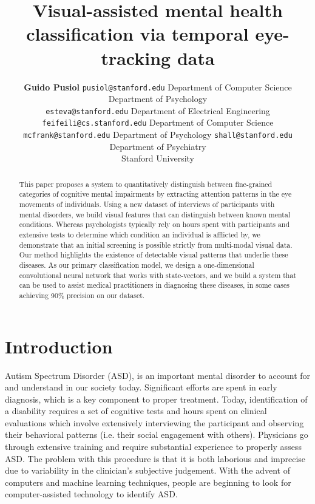 \documentclass[10pt,twocolumn,letterpaper]{article}
\begin{document}
\title{Visual-assisted mental health classification via temporal eye-tracking data}

\author{{\bf Guido Pusiol}
\texttt{pusiol@stanford.edu}
Department of Computer Science\\
Department of Psychology \\
\texttt{esteva@stanford.edu} 
Department of Electrical Engineering
\texttt{feifeili@cs.stanford.edu} 
Department of Computer Science
\texttt{mcfrank@stanford.edu}
Department of Psychology
\texttt{shall@stanford.edu}\\
  Department of Psychiatry\\
Stanford University}
  

\maketitle

\begin{abstract}
This paper proposes a system to quantitatively distinguish between fine-grained categories of cognitive mental impairments by extracting attention patterns in the eye movements of individuals.  
Using a new dataset of interviews of participants with mental disorders, we build visual features that can distinguish between known mental conditions. Whereas psychologists typically rely on hours spent with participants and extensive tests to determine which condition an individual is afflicted by, we demonstrate that an initial screening is possible strictly from multi-modal visual data.
Our method highlights the existence of detectable visual patterns that underlie these diseases. As our primary classification model, we design a one-dimensional convolutional neural network that works with state-vectors, and we build a system that can be used to assist medical practitioners in diagnosing these diseases, in some cases achieving 90\% precision on our dataset.
\end{abstract}
   
\section{Introduction}
   
Autism Spectrum Disorder (ASD), is an important mental disorder to account for and understand in our society today. Significant efforts are spent in early diagnosis, which is a key component to proper treatment.  Today, identification of a disability requires a set of cognitive tests and hours spent on clinical evaluations which involve extensively interviewing the participant and observing their behavioral patterns (i.e. their social engagement with others). Physicians go through extensive training and require substantial experience to properly assess ASD.  The problem with this procedure is that it is both laborious and imprecise due to variability in the clinician's subjective judgement. With the advent of computers and machine learning techniques, people are beginning to look for computer-assisted technology to identify ASD. 
\end{document}
